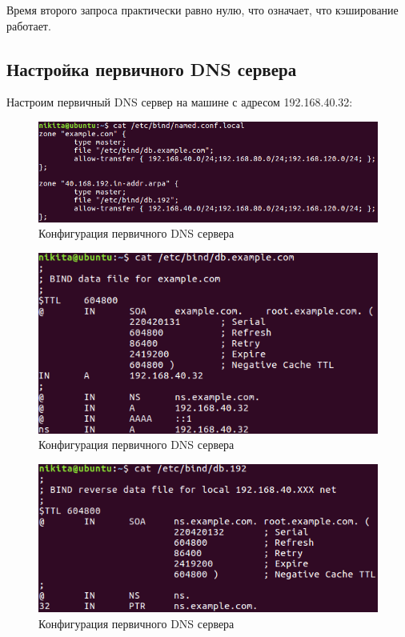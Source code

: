 \documentclass[14pt,a4paper,report]{report}
\begin{document}
Время второго запроса практически равно нулю, что означает, что кэширование работает.

\clearpage

\subsection{Настройка первичного DNS сервера}

Настроим первичный DNS сервер на машине с адресом 192.168.40.32:

\begin{figure}[h!]
	\centering
	\includegraphics[scale = 0.9]{images/4_1.png}
	\caption{Конфигурация первичного DNS сервера}
	\label{image:18}
\end{figure}

\begin{figure}[h!]
	\centering
	\includegraphics[scale = 0.9]{images/4_2.png}
	\caption{Конфигурация первичного DNS сервера}
	\label{image:19}
\end{figure}

\begin{figure}[h!]
	\centering
	\includegraphics[scale = 0.9]{images/4_3.png}
	\caption{Конфигурация первичного DNS сервера}
	\label{image:20}
\end{figure}
\end{document}
